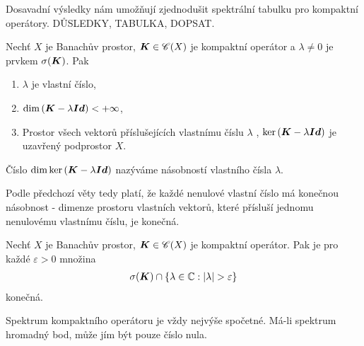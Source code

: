 Dosavadní výsledky nám umožňují zjednodušit spektrální tabulku pro kompaktní operátory. DŮSLEDKY, TABULKA, DOPSAT.

\begin{lemma}
Nechť $X$ je Banachův prostor, $\boldsymbol{K} \in \mathscr{C}(X)$ je kompaktní operátor a $\lambda \neq 0$ je prvkem $\sigma(\boldsymbol{K})$. Pak \begin{enumerate}
    \item $\lambda$ je vlastní číslo,
    \item $\mathrm{dim} \,(\boldsymbol{K} - \lambda \boldsymbol{Id} ) < + \infty$,
    \item Prostor všech vektorů příslušejících vlastnímu číslu $\lambda$ , $\mathrm{ker}\, (\boldsymbol{K} - \lambda \boldsymbol{Id} )$ je uzavřený podprostor $X$.
\end{enumerate}
\end{lemma}

\begin{definition}
Číslo $\mathrm{dim} \, \mathrm{ker}\, (\boldsymbol{K} - \lambda \boldsymbol{Id} )$ nazýváme násobností vlastního čísla $\lambda$.
\end{definition}

Podle předchozí věty tedy platí, že každé nenulové vlastní číslo má konečnou násobnost - dimenze prostoru vlastních vektorů, které přísluší jednomu nenulovému vlastnímu číslu, je konečná.

\begin{lemma}
Nechť $X$ je Banachův prostor, $\boldsymbol{K} \in \mathscr{C}(X)$ je kompaktní operátor. Pak je pro každé $\varepsilon>0$ množina \begin{align*}
    \sigma(\boldsymbol{K}) \cap \left \lbrace \lambda \in \mathbb{C} : |\lambda| > \varepsilon \right \rbrace
\end{align*}
konečná.
\end{lemma}

\begin{corollary}
Spektrum kompaktního operátoru je vždy nejvýše spočetné. Má-li spektrum hromadný bod, může jím být pouze číslo nula.
\end{corollary}

